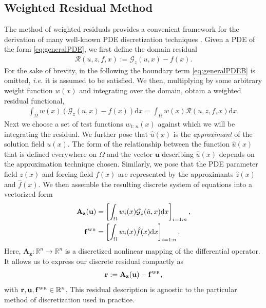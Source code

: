 \documentclass[11pt, fleqn]{article}
\newcommand{\cred}{\textcolor{red}}
\def\A{{\mathbf A}}
\def\z{{\mathbf z}}
\def\fbf{{\mathbf f}}
\def\ubf{{\mathbf u}}
\def\r{{\mathbf r}}
\def\cR{{\mathcal R}}
\def\cG{{\mathcal G}}
\def\bR{{\mathbb R}}
\def\cR{{\mathcal R}}
\def\md{{\mathrm d}}
\newcommand{\rev}[1]{\cred{\underline{#1}}}
\def \fbfWR {{\fbf^{\text{\tiny WR}}}}
\begin{document}
\subsection{Weighted Residual  Method}\label{sec:technical_background:wrm}
%
The method of weighted residuals provides a convenient framework for the derivation of many well-known PDE discretization techniques \cite{strang1986introduction, finlayson2013method, lindgren2009weighted, gerald2004applied}. Given a PDE of the form \eqref{eq:generalPDE}, we first define the domain residual 
\begin{align}\label{eq:nonlinearWRM}
    \cR(u,z,f, x) := \cG_{z}(u, x) - f(x).
\end{align}
For the sake of brevity, in the following the boundary term \eqref{eq:generalPDEB} is omitted, \textit{i.e.} it is assumed to be satisfied. We then, multiplying by some arbitrary weight function $w(x)$ and integrating over the domain, obtain a weighted residual functional,
\begin{align}\label{eq:nonlinearWRMIntegrated}
    \int_{\Omega}w(x)\left(\cG_{z}(u, x) - f(x)\right) \md x =  \int_{\Omega}w(x) \cR(u,z,f, x) \md x.
\end{align}
Next we choose a set of test functions
$w_{1:n}(x)$ against which we will be integrating the residual. We further pose that $\hat{u}(x)$ is the \textit{approximant} of the solution field $u(x)$.
The form of the relationship between the function $\hat{u}(x)$ that is defined everywhere on $\Omega$ and the vector $\ubf$ describing $\hat{u}(x)$ depends on the approximation technique chosen. Similarly, we pose that the PDE parameter field $z(x)$ and forcing field $f(x)$ are represented by the approximants $\hat{z}(x)$ and $\hat{f}(x)$. 
We then assemble the resulting discrete system of equations into a vectorized form 
%
\begin{subequations} \label{eq:discreteDiffOp}

\begin{align}
    \A_{\z}(\ubf) &= \left[\int_{\Omega}w_i(x)\cG_{\hat{z}}(\hat{u}, x) \md x\right]_{i=1:n}, \\
    \fbfWR &= \left[\int_{\Omega}w_i(x)\hat{f}(x) \md x\right]_{i=1:n}.\label{eq:fwr}
\end{align}

\end{subequations}
Here, $\A_{\z}: \bR^n \to \bR^n$ is a discretized nonlinear mapping of the differential operator. It allows us to express our discrete residual compactly as
\begin{equation}\label{eq:discreteResidual}
    \r :=\A_\z(\ubf) - \fbfWR,
\end{equation}
with $\r, \ubf, \fbfWR\in \bR^{n}$. This residual description is agnostic to the particular method of discretization used in practice. 
\end{document}
